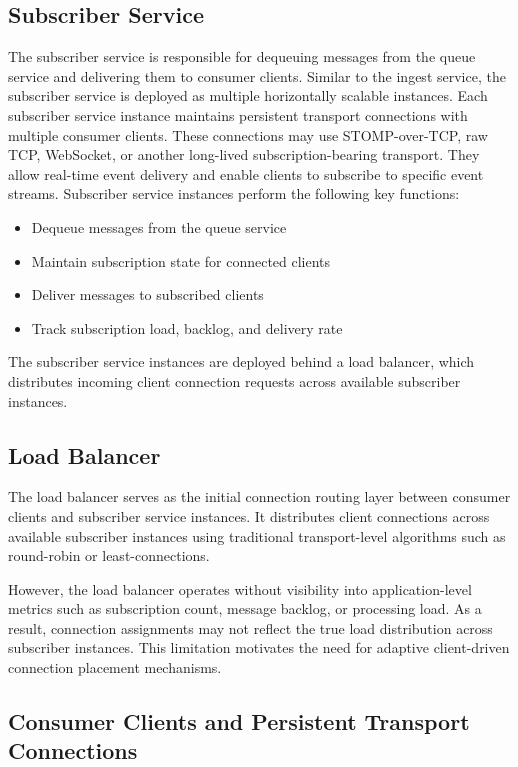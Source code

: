 \documentclass[manuscript,nonacm]{acmart}
\begin{document}
\subsection{Subscriber Service}

The subscriber service is responsible for dequeuing messages from the queue service and delivering them to consumer clients. Similar to the ingest service, the subscriber service is deployed as multiple horizontally scalable instances.
Each subscriber service instance maintains persistent transport connections with multiple consumer clients. These connections may use STOMP-over-TCP, raw TCP, WebSocket, or another long-lived subscription-bearing transport. They allow real-time event delivery and enable clients to subscribe to specific event streams.
Subscriber service instances perform the following key functions:

\begin{itemize}
	\item Dequeue messages from the queue service
	\item Maintain subscription state for connected clients
	\item Deliver messages to subscribed clients
	\item Track subscription load, backlog, and delivery rate
\end{itemize}

The subscriber service instances are deployed behind a load balancer, which distributes incoming client connection requests across available subscriber instances.

\subsection{Load Balancer}

The load balancer serves as the initial connection routing layer between consumer clients and subscriber service instances. It distributes client connections across available subscriber instances using traditional transport-level algorithms such as round-robin or least-connections.

However, the load balancer operates without visibility into application-level metrics such as subscription count, message backlog, or processing load. As a result, connection assignments may not reflect the true load distribution across subscriber instances.
This limitation motivates the need for adaptive client-driven connection placement mechanisms.

\subsection{Consumer Clients and Persistent Transport Connections}
\end{document}
